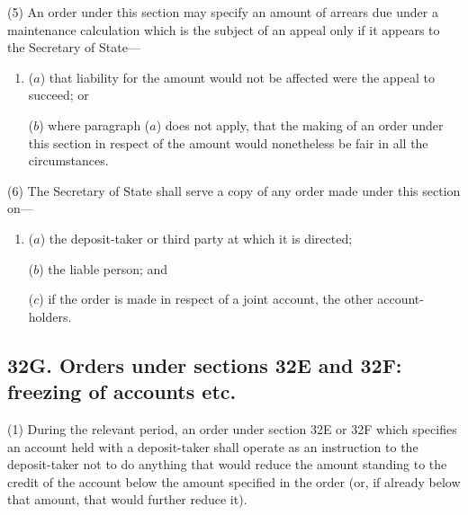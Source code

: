\documentclass[a4paper]{article}
\begin{document}
(5)
An order under this section may specify an amount of arrears due under a maintenance calculation which is the subject of an appeal only if it appears to the Secretary of State---
\begin{enumerate}\item[]
($a$) that liability for the amount would not be affected were the appeal to succeed; or

($b$) where paragraph ($a$) does not apply, that the making of an order under this section in respect of the amount would nonetheless be fair in all the circumstances.
\end{enumerate}

(6) The Secretary of State shall serve a copy of any order made under this section on---
\begin{enumerate}\item[]
($a$) the deposit-taker or third party at which it is directed;

($b$) the liable person; and

($c$) if the order is made in respect of a joint account, the other account-holders.
\end{enumerate}


\subsection{32G. Orders under sections 32E and 32F: freezing of accounts etc.}

(1) During the relevant period, an order under section 32E or 32F which
specifies an account held with a deposit-taker shall operate as an instruction to the deposit-taker not to do anything that would reduce the amount standing to the credit of the account below the amount specified in the order (or, if already below that amount, that would further reduce it).
\end{document}
